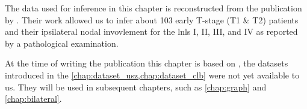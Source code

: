 \begin{tcolorbox}[title=\faIcon{database} Data, parbox=false]
    The data used for inference in this chapter is reconstructed from the publication by . Their work allowed us to infer about 103 early T-stage (T1 \& T2) patients and their ipsilateral nodal invovlement for the \glspl{lnl} I, II, III, and IV as reported by a pathological examination.

    At the time of writing the publication this chapter is based on \cite{ludwig_hidden_2021}, the datasets introduced in the \cref{chap:dataset_usz,chap:dataset_clb} were not yet available to us. They will be used in subsequent chapters, such as \cref{chap:graph} and \cref{chap:bilateral}.
\end{tcolorbox}
